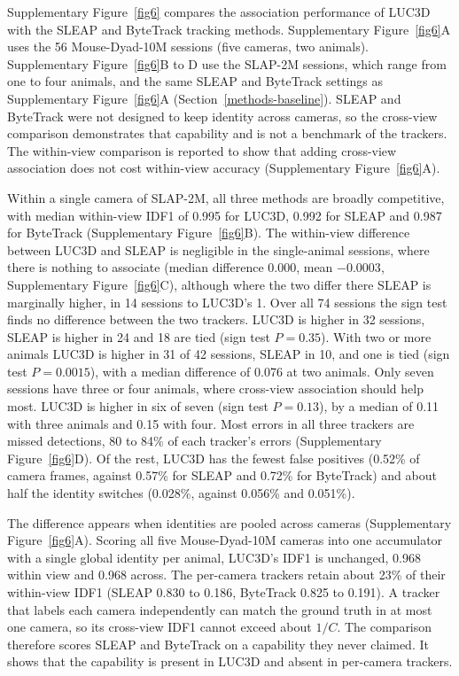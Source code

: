 \documentclass[pdflatex, sn-nature]{sn-jnl}
\theoremstyle{thmstyleone}%
\theoremstyle{thmstyletwo}%
\theoremstyle{thmstylethree}%
\begin{document}
Supplementary Figure~\ref{fig6} compares the association performance of LUC3D with the SLEAP and ByteTrack tracking methods. Supplementary Figure~\ref{fig6}A uses the 56 Mouse-Dyad-10M sessions (five cameras, two animals). Supplementary Figure~\ref{fig6}B to D use the SLAP-2M sessions, which range from one to four animals, and the same SLEAP and ByteTrack settings as Supplementary Figure~\ref{fig6}A (Section~\ref{methods-baseline}). SLEAP and ByteTrack were not designed to keep identity across cameras, so the cross-view comparison demonstrates that capability and is not a benchmark of the trackers. The within-view comparison is reported to show that adding cross-view association does not cost within-view accuracy (Supplementary Figure~\ref{fig6}A).

Within a single camera of SLAP-2M, all three methods are broadly competitive, with median within-view IDF1 of 0.995 for LUC3D, 0.992 for SLEAP and 0.987 for ByteTrack (Supplementary Figure~\ref{fig6}B). The within-view difference between LUC3D and SLEAP is negligible in the single-animal sessions, where there is nothing to associate (median difference 0.000, mean $-0.0003$, Supplementary Figure~\ref{fig6}C), although where the two differ there SLEAP is marginally higher, in 14 sessions to LUC3D's 1. Over all 74 sessions the sign test finds no difference between the two trackers. LUC3D is higher in 32 sessions, SLEAP is higher in 24 and 18 are tied (sign test $P = 0.35$). With two or more animals LUC3D is higher in 31 of 42 sessions, SLEAP in 10, and one is tied (sign test $P = 0.0015$), with a median difference of 0.076 at two animals. Only seven sessions have three or four animals, where cross-view association should help most. LUC3D is higher in six of seven (sign test $P = 0.13$), by a median of 0.11 with three animals and 0.15 with four. Most errors in all three trackers are missed detections, 80 to 84\% of each tracker's errors (Supplementary Figure~\ref{fig6}D). Of the rest, LUC3D has the fewest false positives (0.52\% of camera frames, against 0.57\% for SLEAP and 0.72\% for ByteTrack) and about half the identity switches (0.028\%, against 0.056\% and 0.051\%).

The difference appears when identities are pooled across cameras (Supplementary Figure~\ref{fig6}A). Scoring all five Mouse-Dyad-10M cameras into one accumulator with a single global identity per animal, LUC3D's IDF1 is unchanged, 0.968 within view and 0.968 across. The per-camera trackers retain about 23\% of their within-view IDF1 (SLEAP 0.830 to 0.186, ByteTrack 0.825 to 0.191). A tracker that labels each camera independently can match the ground truth in at most one camera, so its cross-view IDF1 cannot exceed about $1/C$. The comparison therefore scores SLEAP and ByteTrack on a capability they never claimed. It shows that the capability is present in LUC3D and absent in per-camera trackers.
\end{document}
